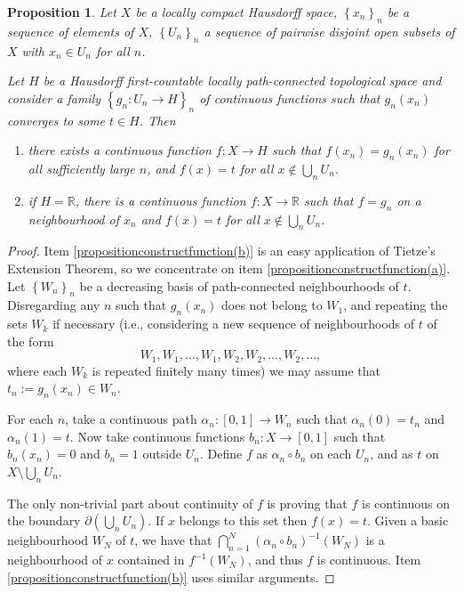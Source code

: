 \documentclass[letter,11pt]{amsart}
\theoremstyle{plain}		\newtheorem{theorem}[generalnumbering]{Theorem}
\theoremstyle{plain}		\newtheorem{corollary}[generalnumbering]{Corollary}
\theoremstyle{definition}		\newtheorem{definition}[generalnumbering]{Definition}
\theoremstyle{definition}		\newtheorem{example}[generalnumbering]{Example}
\theoremstyle{plain}		\newtheorem{proposition}[generalnumbering]{Proposition}
\theoremstyle{plain}		\newtheorem{lemma}[generalnumbering]{Lemma}
\theoremstyle{plain}    \newtheorem{plainstyle}[generalnumbering]{\namefordifferentenvironment}
\theoremstyle{plain}    \newtheorem*{plainstyle*}{\namefordifferentenvironment}
\theoremstyle{definition}    \newtheorem{definitionstyle}[generalnumbering]{\namefordifferentenvironment}
\theoremstyle{definition}    \newtheorem*{definitionstyle*}{\namefordifferentenvironment}
\begin{document}
\begin{proposition}\label{propositionconstructfunction}
	Let $X$ be a locally compact Hausdorff space, $\left\{x_n\right\}_n$ be a sequence of elements of $X$, $\left\{U_n\right\}_n$ a sequence of pairwise disjoint open subsets of $X$ with $x_n\in U_n$ for all $n$.
	
	Let $H$ be a Hausdorff first-countable locally path-connected topological space and consider a family $\left\{g_n\colon U_n\to H\right\}_n$ of continuous functions such that $g_n(x_n)$ converges to some $t\in H$. Then
	\begin{enumerate}[label=(\alph*)]
		\item\label{propositionconstructfunction(a)} there exists a continuous function $f\colon X\to H$ such that $f(x_n)=g_n(x_n)$ for all sufficiently large $n$, and $f(x)=t$ for all $x\not\in\bigcup_n U_n$.
		\item\label{propositionconstructfunction(b)} if $H=\mathbb{R}$, there is a continuous function $f\colon X\to\mathbb{R}$ such that $f=g_n$ on a neighbourhood of $x_n$ and $f(x)=t$ for all $x\not\in\bigcup_n U_n$.
	\end{enumerate}
\end{proposition}
\begin{proof} Item \ref{propositionconstructfunction(b)} is an easy application of Tietze's Extension Theorem, so we concentrate on item \ref{propositionconstructfunction(a)}. Let $\left\{W_n\right\}_n$ be a decreasing basis of path-connected neighbourhoods of $t$. Disregarding any $n$ such that $g_n(x_n)$ does not belong to $W_1$, and repeating the sets $W_k$ if necessary (i.e., considering a new sequence of neighbourhoods of $t$ of the form
	\[W_1,W_1,\ldots,W_1,W_2,W_2,\ldots,W_2,\ldots,\]
	where each $W_k$ is repeated finitely many times) we may assume that $t_n:=g_n(x_n)\in W_n$.
	
	For each $n$, take a continuous path $\alpha_n\colon [0,1]\to W_n$ such that $\alpha_n(0)=t_n$ and $\alpha_n(1)=t$. Now take continuous functions $b_n\colon X\to[0,1]$ such that $b_n(x_n)=0$ and $b_n=1$ outside $U_n$. Define $f$ as $\alpha_n\circ b_n$ on each $U_n$, and as $t$ on $X\setminus\bigcup_n U_n$.
	
	The only non-trivial part about continuity of $f$ is proving that $f$ is continuous on the boundary $\partial\left(\bigcup_n U_n\right)$. If $x$ belongs to this set then $f(x)=t$. Given a basic neighbourhood $W_N$ of $t$, we have that $\bigcap_{n=1}^N(\alpha_n\circ b_n)^{-1}(W_N)$ is a neighbourhood of $x$ contained in $f^{-1}(W_N)$, and thus $f$ is continuous. Item \ref{propositionconstructfunction(b)} uses similar arguments.
\end{proof}
\end{document}
